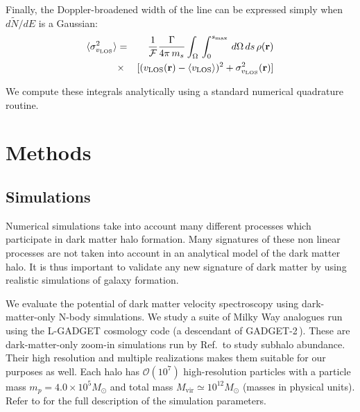 \documentclass[aps,prd,10pt,twocolumn,superscriptaddress,showpacs]{revtex4-1}
\newcommand{\br}[0]{\mathbf{r}}
\newcommand{\los}[0]{\mathrm{LOS}}
\begin{document}
Finally, the Doppler-broadened width of the line can be expressed simply when $d\tilde{N}/dE$ is a Gaussian:
\begin{eqnarray}
	\langle \sigma_{v_\los}^2 \rangle &=& \frac{1}{\mathcal{F}}\frac{\Gamma}{4\pi \, m_s} 
	\int _\Omega \, \int _0 ^{s_{\rm max}}  \, d\Omega\,ds \, \rho(\br)\nonumber \\ 
	&\times&   [(v_\los(\br)-\langle v_\los\rangle)^2+\sigma_{v_\los}^2(\br)] 
\label{eq:lineshift}
\end{eqnarray}

We compute these integrals analytically using a standard numerical quadrature routine.



\section{Methods}

\subsection{Simulations}
\label{sec:simulations}

Numerical simulations take into account many different processes which participate in dark matter halo formation.  Many signatures of these non linear processes are not taken into account in an analytical model of the dark matter halo.  It is thus important to validate any new signature of dark matter by using realistic simulations of galaxy formation.

We evaluate the potential of dark matter velocity spectroscopy using dark-matter-only N-body
simulations.  We study a suite of Milky Way analogues run using the L-GADGET cosmology code (a
descendant of GADGET-2\,\cite{springel2005}). These are dark-matter-only zoom-in simulations run by
Ref.\,\cite{mao2015} to study subhalo abundance. Their high resolution and multiple realizations
makes them suitable for our purposes as well. Each halo has $\mathcal{O}(10^7)$ high-resolution
particles with a particle mass $m_p=4.0 \times 10^5 M_{\odot}$ and total  mass
$M_{\mathrm{vir}}\simeq 10^{12} M_{\odot}$ (masses in physical units). Refer to \cite{mao2015} for
the full description of the simulation parameters.
\end{document}
